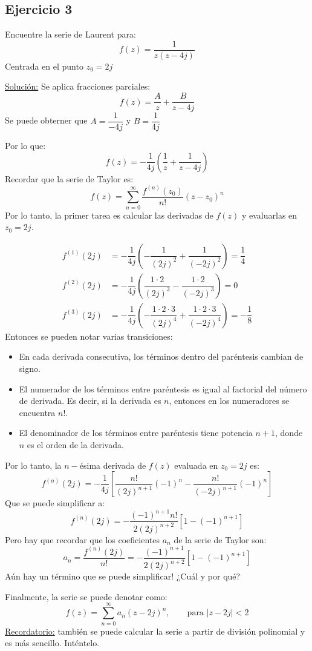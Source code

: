 
\subsection*{Ejercicio 3}

	Encuentre la serie de Laurent para:
	$$ f(z) = \dfrac{1}{z(z-4j)} $$
	Centrada en el punto $z_0=2j$\par
	\underline{Solución:}
	Se aplica fracciones parciales:
	$$ f(z) = \dfrac{A}{z} + \dfrac{B}{z-4j} $$
	Se puede obterner que $A=\dfrac{1}{-4j}$ y $B=\dfrac{1}{4j}$ \par
	Por lo que:
	$$ f(z) = -\dfrac{1}{4j} \left (\dfrac{1}{z} + \dfrac{1}{z-4j} \right) $$
	Recordar que la serie de Taylor es:
	$$ f(z) = \sum_{n=0}^{\infty} \dfrac{f^{(n)} (z_0)}{n!} (z-z_0)^n$$
	Por lo tanto, la primer tarea es calcular las derivadas de $f(z)$ y evaluarlas en $z_0=2j$. \par
	\begin{align*}
		f^{(1)}(2j) &= -\dfrac{1}{4j} \left (-\dfrac{1}{(2j)^2} + \dfrac{1}{(-2j)^2} \right) = \dfrac{1}{4}\\
		f^{(2)}(2j) &= -\dfrac{1}{4j} \left (\dfrac{1\cdot 2}{(2j)^3} - \dfrac{1\cdot 2}{(-2j)^3} \right) = 0\\
		f^{(3)}(2j) &= -\dfrac{1}{4j} \left (-\dfrac{1\cdot 2 \cdot 3}{(2j)^4} + \dfrac{1\cdot 2 \cdot 3}{(-2j)^4} \right) = -\dfrac{1}{8}
	\end{align*}
	Entonces se pueden notar varias transiciones:
	\begin{itemize}
		\item En cada derivada consecutiva, los términos dentro del paréntesis cambian de signo.
		\item El numerador de los términos entre paréntesis es igual al factorial del número de derivada. Es decir, si la derivada es $n$, entonces en los numeradores se encuentra $n!$.
		\item El denominador de los términos entre paréntesis tiene potencia $n+1$, donde $n$ es el orden de la derivada.
	\end{itemize}
	Por lo tanto, la $n-$ésima derivada de $f(z)$ evaluada en $z_0=2j$ es:
	$$ f^{(n)}(2j) = -\dfrac{1}{4j}\left[ \dfrac{n!}{(2j)^{n+1}}(-1)^n - \dfrac{n!}{(-2j)^{n+1}} (-1)^n \right]$$
	Que se puede simplificar a:
	$$ f^{(n)}(2j) = -\dfrac{(-1)^{n+1} n!}{2 (2j)^{n+2}} [1-(-1)^{n+1}] $$
	Pero hay que recordar que los coeficientes $a_n$ de la serie de Taylor son:
	$$ a_n = \dfrac{f^{(n)}(2j)}{n!} = -\dfrac{(-1)^{n+1}}{2 (2j)^{n+2}} [1-(-1)^{n+1}] $$
	Aún hay un término que se puede simplificar! ¿Cuál y por qué?\par
	Finalmente, la serie se puede denotar como:
	$$ f(z) = \sum_{n=0}^{\infty} a_n (z-2j)^n, \qquad \text{para $|z-2j|<2$}$$
	\underline{Recordatorio:}
	también se puede calcular la serie a partir de división polinomial y es más sencillo. Inténtelo.
	
